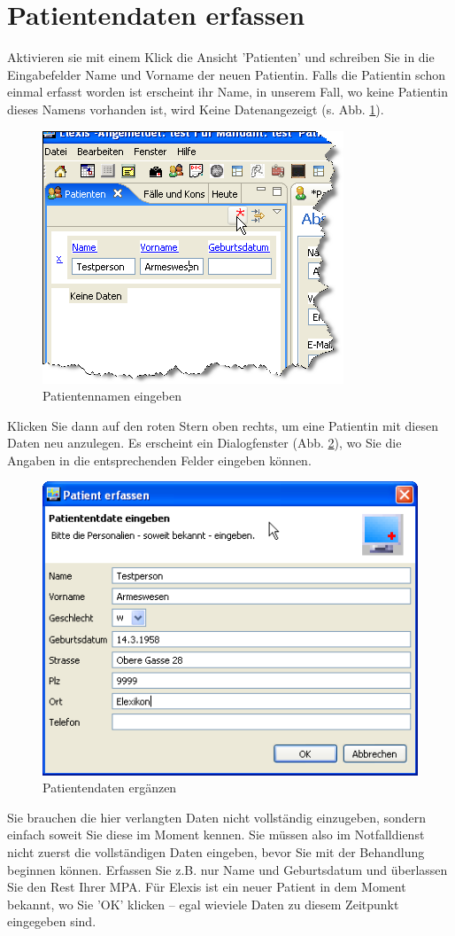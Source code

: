 \section{Patientendaten erfassen}
Aktivieren sie mit einem Klick die Ansicht 'Patienten' und schreiben Sie in die Eingabefelder Name und Vorname der neuen Patientin.
Falls die Patientin schon einmal erfasst worden ist erscheint ihr Name, in unserem Fall, wo keine Patientin dieses Namens vorhanden ist,
wird \glqq Keine Daten\grqq{}angezeigt (s. Abb. \ref{fig:patname}).
\begin{figure}[h]
	\includegraphics{images/einf1}
	\caption{Patientennamen eingeben}
	\label{fig:patname}
\end{figure}
Klicken Sie dann auf den roten Stern oben rechts, um eine Patientin mit diesen
Daten neu anzulegen. Es erscheint ein Dialogfenster (Abb. \ref{fig:patdata}), wo
Sie die Angaben in die entsprechenden Felder eingeben können.
\begin{figure}[ht]
	\includegraphics{images/einf2}
	\caption{Patientendaten ergänzen}
	\label{fig:patdata}
\end{figure}
Sie brauchen die hier verlangten Daten nicht vollständig einzugeben, sondern einfach soweit Sie diese im Moment kennen.
Sie müssen also im Notfalldienst nicht zuerst die vollständigen Daten eingeben, bevor Sie mit der Behandlung beginnen können.
Erfassen Sie z.B. nur Name und Geburtsdatum und überlassen Sie den Rest Ihrer MPA. Für Elexis ist ein neuer Patient in dem Moment bekannt,
wo Sie 'OK' klicken -- egal wieviele Daten zu diesem Zeitpunkt eingegeben sind.

